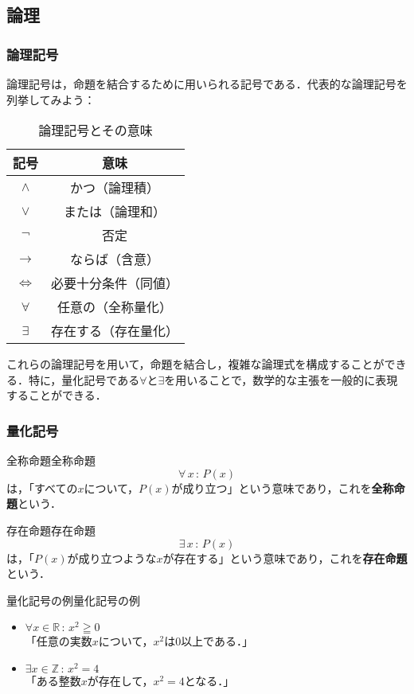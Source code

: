 \documentclass[a4paper,11pt]{ltjsarticle}
\renewcommand{\emph}[1]{\textbf{#1}}
\renewcommand{\geq}{\geqq}
\begin{document}
\subsection{論理}
\subsubsection{論理記号}

	論理記号は，命題を結合するために用いられる記号である．代表的な論理記号を列挙してみよう：
	\begin{table}[htbp]
		\centering
		\caption{論理記号とその意味}
		\begin{tabular}{c|c}
		\hline
		記号 & 意味 \\
		\hline
    $\land$ & かつ（論理積） \\
    $\lor$ & または（論理和） \\
    $\lnot$ & 否定 \\
    $\to$ & ならば（含意） \\
    $\Leftrightarrow$ & 必要十分条件（同値） \\
    $\forall$ & 任意の（全称量化） \\
    $\exists$ & 存在する（存在量化） \\
		\hline
		\end{tabular}
		\end{table}

    これらの論理記号を用いて，命題を結合し，複雑な論理式を構成することができる．特に，量化記号である$\forall$と$\exists$を用いることで，数学的な主張を一般的に表現することができる．

    \subsubsection{量化記号}
    
    
    \begin{definition}{全称命題}{全称命題}
        \[
          \forall\, x \, : \, P(x)
        \]
        は，「すべての$x$について，$P(x)$が成り立つ」という意味であり，これを\emph{全称命題}という．
    \end{definition}
    

    \begin{definition}{存在命題}{存在命題}
        \[
        \exists \,  x\, : \, P(x)
        \]
        は，「$P(x)$が成り立つような$x$が存在する」という意味であり，これを\emph{存在命題}という．
    \end{definition}
    
    \begin{example}{量化記号の例}{量化記号の例}
        \begin{itemize}
            \item $\forall x \in \mathbb{R}\, : \, x^2 \geq 0$\\
            「任意の実数$x$について，$x^2$は$0$以上である．」
            \item $\exists x \in \mathbb{Z} \, : \, x^2 = 4$\\
            「ある整数$x$が存在して，$x^2 = 4$となる．」
        \end{itemize}
    \end{example}
\end{document}
